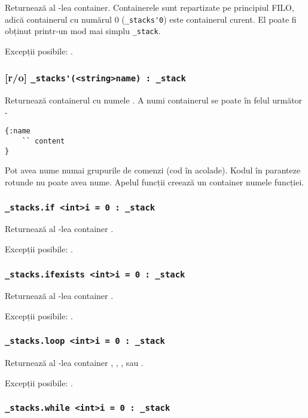 Returnează al -lea container. Containerele sunt repartizate pe principiul FILO, adică containerul cu numărul 0  (\lstinline|_stacks'0|) este containerul curent. El poate fi obținut printr-un mod mai simplu \lstinline|_stack|.

Excepții posibile: .

\subsubsection{[r/o] \lstinline|_stacks'(<string>name) : _stack|}

Returnează containerul cu numele . A numi containerul se poate în felul următor -
\begin{lstlisting}[numbers=none]
{:name
	`` content
}
\end{lstlisting}
Pot avea nume numai grupurile de comenzi (cod în acolade). Kodul în paranteze rotunde nu poate avea nume. Apelul funcții creează un container numele funcției.

\subsubsection{\lstinline|_stacks.if <int>i = 0 : _stack|}

Returnează al -lea container .

Excepții posibile: .

\subsubsection{\lstinline|_stacks.ifexists <int>i = 0 : _stack|}

Returnează al -lea container .

Excepții posibile: .

\subsubsection{\lstinline|_stacks.loop <int>i = 0 : _stack|}

Returnează al -lea container , , ,  sau .

Excepții posibile: .

\subsubsection{\lstinline|_stacks.while <int>i = 0 : _stack|}

